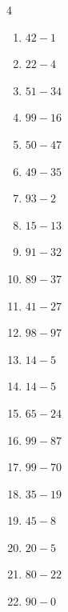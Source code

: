 \begin{multicols}{4}
\begin{enumerate}
  \item $42-1$
        \phantom{$=41$}

  \item $22-4$
        \phantom{$=18$}

  \item $51-34$
        \phantom{$=17$}

  \item $99-16$
        \phantom{$=83$}

  \item $50-47$
        \phantom{$=3$}

  \item $49-35$
        \phantom{$=14$}

  \item $93-2$
        \phantom{$=91$}

  \item $15-13$
        \phantom{$=2$}

  \item $91-32$
        \phantom{$=59$}

  \item $89-37$
        \phantom{$=52$}

  \item $41-27$
        \phantom{$=14$}

  \item $98-97$
        \phantom{$=1$}

  \item $14-5$
        \phantom{$=9$}

  \item $14-5$
        \phantom{$=9$}

  \item $65-24$
        \phantom{$=41$}

  \item $99-87$
        \phantom{$=12$}

  \item $99-70$
        \phantom{$=29$}

  \item $35-19$
        \phantom{$=16$}

  \item $45-8$
        \phantom{$=37$}

  \item $20-5$
        \phantom{$=15$}

  \item $80-22$
        \phantom{$=58$}

  \item $90-0$
        \phantom{$=90$}


\end{enumerate}
\end{multicols}
